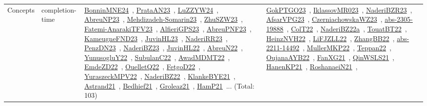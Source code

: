 {\begin{longtable}{lp{3cm}>{\raggedright\arraybackslash}p{6cm}>{\raggedright\arraybackslash}p{6cm}>{\raggedright\arraybackslash}p{8cm}}
\index{completion-time}\index{Concepts!completion-time}Concepts & completion-time & \href{../works/BonninMNE24.pdf}{BonninMNE24}~\cite{BonninMNE24}, \href{../works/PrataAN23.pdf}{PrataAN23}~\cite{PrataAN23}, \href{../works/LuZZYW24.pdf}{LuZZYW24}~\cite{LuZZYW24}, \href{../works/AbreuNP23.pdf}{AbreuNP23}~\cite{AbreuNP23}, \href{../works/Mehdizadeh-Somarin23.pdf}{Mehdizadeh-Somarin23}~\cite{Mehdizadeh-Somarin23}, \href{../works/ZhuSZW23.pdf}{ZhuSZW23}~\cite{ZhuSZW23}, \href{../works/Fatemi-AnarakiTFV23.pdf}{Fatemi-AnarakiTFV23}~\cite{Fatemi-AnarakiTFV23}, \href{../works/AlfieriGPS23.pdf}{AlfieriGPS23}~\cite{AlfieriGPS23}, \href{../works/AbreuPNF23.pdf}{AbreuPNF23}~\cite{AbreuPNF23}, \href{../works/KameugneFND23.pdf}{KameugneFND23}~\cite{KameugneFND23}, \href{../works/JuvinHL23.pdf}{JuvinHL23}~\cite{JuvinHL23}, \href{../works/NaderiRR23.pdf}{NaderiRR23}~\cite{NaderiRR23}, \href{../works/PenzDN23.pdf}{PenzDN23}~\cite{PenzDN23}, \href{../works/NaderiBZ23.pdf}{NaderiBZ23}~\cite{NaderiBZ23}, \href{../works/JuvinHL22.pdf}{JuvinHL22}~\cite{JuvinHL22}, \href{../works/AbreuN22.pdf}{AbreuN22}~\cite{AbreuN22}, \href{../works/YunusogluY22.pdf}{YunusogluY22}~\cite{YunusogluY22}, \href{../works/SubulanC22.pdf}{SubulanC22}~\cite{SubulanC22}, \href{../works/AwadMDMT22.pdf}{AwadMDMT22}~\cite{AwadMDMT22}, \href{../works/EmdeZD22.pdf}{EmdeZD22}~\cite{EmdeZD22}, \href{../works/OuelletQ22.pdf}{OuelletQ22}~\cite{OuelletQ22}, \href{../works/FetgoD22.pdf}{FetgoD22}~\cite{FetgoD22}, \href{../works/YuraszeckMPV22.pdf}{YuraszeckMPV22}~\cite{YuraszeckMPV22}, \href{../works/NaderiBZ22.pdf}{NaderiBZ22}~\cite{NaderiBZ22}, \href{../works/KlankeBYE21.pdf}{KlankeBYE21}~\cite{KlankeBYE21}, \href{../works/Astrand21.pdf}{Astrand21}~\cite{Astrand21}, \href{../works/Bedhief21.pdf}{Bedhief21}~\cite{Bedhief21}, \href{../works/Groleaz21.pdf}{Groleaz21}~\cite{Groleaz21}, \href{../works/HamP21.pdf}{HamP21}~\cite{HamP21}... (Total: 103) & \href{../works/GokPTGO23.pdf}{GokPTGO23}~\cite{GokPTGO23}, \href{../works/IklassovMR023.pdf}{IklassovMR023}~\cite{IklassovMR023}, \href{../works/NaderiBZR23.pdf}{NaderiBZR23}~\cite{NaderiBZR23}, \href{../works/AfsarVPG23.pdf}{AfsarVPG23}~\cite{AfsarVPG23}, \href{../works/CzerniachowskaWZ23.pdf}{CzerniachowskaWZ23}~\cite{CzerniachowskaWZ23}, \href{../works/abs-2305-19888.pdf}{abs-2305-19888}~\cite{abs-2305-19888}, \href{../works/ColT22.pdf}{ColT22}~\cite{ColT22}, \href{../works/NaderiBZ22a.pdf}{NaderiBZ22a}~\cite{NaderiBZ22a}, \href{../works/TouatBT22.pdf}{TouatBT22}~\cite{TouatBT22}, \href{../works/HeinzNVH22.pdf}{HeinzNVH22}~\cite{HeinzNVH22}, \href{../works/LiFJZLL22.pdf}{LiFJZLL22}~\cite{LiFJZLL22}, \href{../works/ZhangBB22.pdf}{ZhangBB22}~\cite{ZhangBB22}, \href{../works/abs-2211-14492.pdf}{abs-2211-14492}~\cite{abs-2211-14492}, \href{../works/MullerMKP22.pdf}{MullerMKP22}~\cite{MullerMKP22}, \href{../works/Teppan22.pdf}{Teppan22}~\cite{Teppan22}, \href{../works/OujanaAYB22.pdf}{OujanaAYB22}~\cite{OujanaAYB22}, \href{../works/FanXG21.pdf}{FanXG21}~\cite{FanXG21}, \href{../works/QinWSLS21.pdf}{QinWSLS21}~\cite{QinWSLS21}, \href{../works/HanenKP21.pdf}{HanenKP21}~\cite{HanenKP21}, \href{../works/RoshanaeiN21.pdf}{RoshanaeiN21}~\cite{RoshanaeiN21}, 
\end{longtable}}
